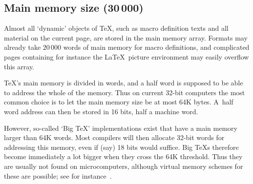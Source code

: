 \documentclass[twoside,letterpaper,openright]{rapport3}
\begin{document}
\subsection{Main memory size (30$\,$000)}

Almost all `dynamic' objects of \TeX, such as macro definition
texts and all material on the current page, 
are stored in the main memory array. 
Formats may already take $20\,000$ words of
main memory for macro definitions, and complicated pages containing
for instance the \LaTeX\ picture environment may easily
overflow this array. 

\TeX's main memory is divided in words, and a half word
is supposed to be able to address the whole of the memory.
Thus on current 32-bit computers the most common choice
is to let the main memory size be at most 64K bytes.
A~half word address can then be stored in 16 bits,
half a machine word.

However, so-called `Big \TeX' implementations exist
that have a main memory larger than 64K words.
Most compilers will then allocate  32-bit words for
addressing this memory, even if (say) 18 bits would
suffice. Big \TeX s therefore become immediately
a lot bigger when they cross the 64K threshold.
Thus they are usually not found on microcomputers,
although virtual memory schemes for these are possible;
see for instance~\cite{Thull}.
\end{document}
